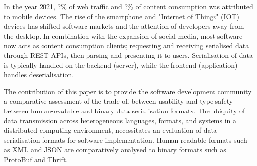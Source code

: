 \documentclass[../report.tex]{subfiles}
\begin{document}
In the year 2021, ?\% of web traffic and ?\% of content consumption was attributed to mobile devices. The rise of the smartphone and "Internet of Things" (IOT) devices has shifted software markets and the attention of developers away from the desktop. In combination with the expansion of social media, most software now acts as content consumption clients; requesting and receiving serialised data through REST APIs, then parsing and presenting it to users. Serialisation of data is typically handled on the backend (server), while the frontend (application) handles deserialisation.

The contribution of this paper is to provide the software development community a comparative assessment of the trade-off between usability and type safety between human-readable and binary data serialisation formats. The ubiquity of data transmission across heterogeneous languages, formats, and systems in a distributed computing environment, necessitates an evaluation of data serialisation formats for software implementation. Human-readable formats such as XML and JSON are comparatively analysed to binary formats such as ProtoBuf and Thrift.
\end{document}
